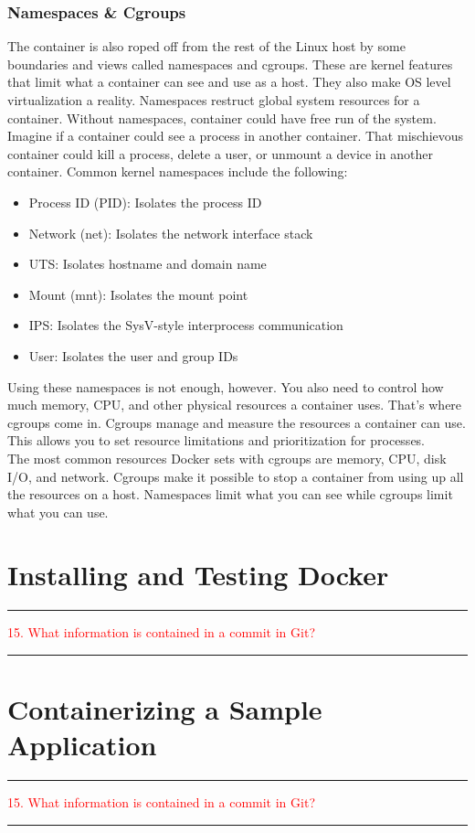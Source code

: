 \documentclass{article}
\begin{document}
\subsubsection{Namespaces \& Cgroups}
The container is also roped off from the rest of the Linux host by some boundaries and views called namespaces and cgroups. These are kernel features that limit what a container can see and use as a host. They also make OS level virtualization a reality. Namespaces restruct global system resources for a container. Without namespaces, container could have free run of the system. Imagine if a container could see a process in another container. That mischievous container could kill a process, delete a user, or unmount a device in another container. Common kernel namespaces include the following:
\begin{itemize}
    \item Process ID (PID): Isolates the process ID
    \item Network (net): Isolates the network interface stack
    \item UTS: Isolates hostname and domain name
    \item Mount (mnt): Isolates the mount point
    \item IPS: Isolates the SysV-style interprocess communication
    \item User: Isolates the user and group IDs
\end{itemize}
Using these namespaces is not enough, however. You also need to control how much memory, CPU, and other physical resources a container uses. That's where cgroups come in. Cgroups manage and measure the resources a container can use. This allows you to set resource limitations and prioritization for processes. \\
The most common resources Docker sets with cgroups are memory, CPU, disk I/O, and network. Cgroups make it possible to stop a container from using up all the resources on a host. Namespaces limit what you can see while cgroups limit what you can use. 
\section{Installing and Testing Docker}
\noindent
{\color{red} \rule{\linewidth}{0.5mm}}
\textcolor{red}{15. What information is contained in a commit  in Git?} \\
\noindent
{\color{red} \rule{\linewidth}{0.5mm}}
\section{Containerizing a Sample Application}
\noindent
{\color{red} \rule{\linewidth}{0.5mm}}
\textcolor{red}{15. What information is contained in a commit  in Git?} \\
\noindent
{\color{red} \rule{\linewidth}{0.5mm}}
\end{document}
